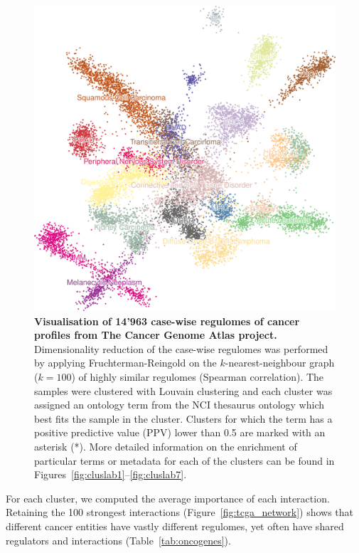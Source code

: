 \begin{figure}[htb!]
	\centering
	\includegraphics[width=.6\linewidth]{fig/tcga/plot_fr_cropped.png}
	\caption{
		\textbf{Visualisation of 14'963 case-wise regulomes of cancer profiles from The Cancer Genome Atlas project.} 
		Dimensionality reduction of the case-wise regulomes was performed by applying Fruchterman-Reingold \cite{fruchterman_graphdrawingforcedirected_1991} on the $k$-nearest-neighbour graph ($k=100$) of highly similar regulomes (Spearman correlation). The samples were clustered with Louvain clustering \cite{blondel_fastunfoldingcommunities_2008} and each cluster was assigned an ontology term from the NCI thesaurus ontology \cite{sioutos_ncithesaurussemantic_2007} which best fits the sample in the cluster. Clusters for which the term has a positive predictive value (PPV) lower than 0.5 are marked with an asterisk (*). More detailed information on the enrichment of particular terms or metadata for each of the clusters can be found in Figures~\ref{fig:cluslab1}--\ref{fig:cluslab7}.
	}
	\label{fig:tcga_dimred}
\end{figure}

For each cluster, we computed the average importance of each interaction. Retaining the 100 strongest interactions (Figure~\ref{fig:tcga_network}) shows that different cancer entities have vastly different regulomes, yet often have shared regulators and interactions (Table~\ref{tab:oncogenes}).

